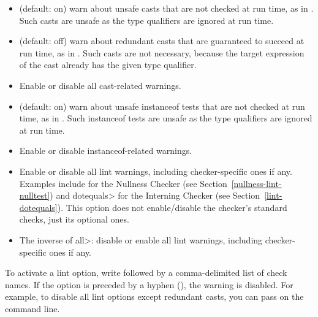 \begin{itemize}

\item
   (default: on) warn about unsafe casts that are not
  checked at run time, as in .
  Such casts are unsafe as the type qualifiers are ignored at run time.

\item
   (default: off) warn about redundant
  casts that are guaranteed to succeed at run time,
  as in .  Such casts are not necessary,
  because the target expression of the cast already has the given type
  qualifier.

\item
   Enable or disable all cast-related warnings.

\item
   (default: on) warn about unsafe instanceof tests
  that are not checked at run time, as in .
  Such instanceof tests are unsafe as the type qualifiers are ignored at run time.

\item
   Enable or disable instanceof-related warnings.

\item
\begin{sloppypar}
   Enable or disable all lint warnings, including
  checker-specific ones if any.  Examples include  for the
  Nullness Checker (see Section~\ref{nullness-lint-nulltest}) and \<dotequals> for
  the Interning Checker (see Section~\ref{lint-dotequals}).  This option
  does not enable/disable the checker's standard checks, just its optional
  ones.
\end{sloppypar}

\item
   The inverse of \<all>:  disable or enable all lint warnings,
  including checker-specific ones if any.

\end{itemize}


\noindent
To activate a lint option, write  followed by a
comma-delimited list of check names.  If the option is preceded by a
hyphen (\code{-}), the warning is disabled.  For example, to disable all
lint options except redundant casts, you can pass
 on the command line.

